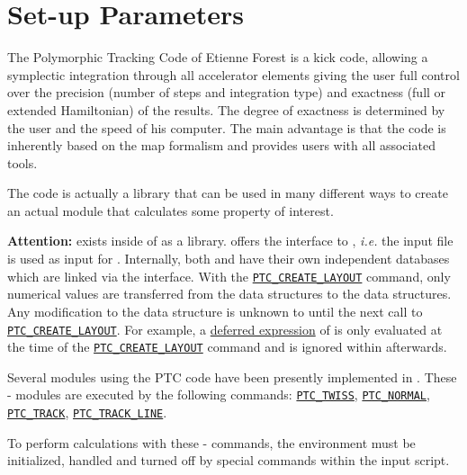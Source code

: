
\chapter{\ptc Set-up Parameters}
\label{chap:ptc-setup}

The Polymorphic Tracking Code \cite{forest2002} of Etienne
Forest is a kick code, allowing a symplectic integration through all
accelerator elements giving the user full control over the precision
(number of   steps and integration type) and exactness (full or extended
Hamiltonian) of the   results. 
The degree of exactness is determined by the user and the speed of his
computer.  
The main advantage is that the code is inherently based on the map
formalism and provides users with all associated tools. 

The \ptc code is actually a library that can be used in many different
ways to create an actual module that calculates some property of
interest. 

\textbf{Attention:}
\ptc exists inside of \madx as a library. \madx offers the interface to
\ptc, \textsl{i.e.} the \madx input file is used as input for \ptc.
Internally, both \ptc and \madx have their own independent databases
which are linked via the interface. With the
\hyperref[sec:ptc-create-layout]{\texttt{PTC\_CREATE\_LAYOUT}} command,
only numerical values are transferred 
from the \madx data structures to the \ptc data structures. Any
modification to the \madx data structure is unknown to \ptc until the
next call to \hyperref[sec:ptc-create-layout]{\texttt{PTC\_CREATE\_LAYOUT}}. 
For example, a \hyperref[sec:defer]{deferred expression} of \madx is
only evaluated at the time of the
\hyperref[sec:ptc-create-layout]{\texttt{PTC\_CREATE\_LAYOUT}} command and
is ignored within \ptc afterwards. 


Several modules using the PTC code have been presently implemented in
\madx. These {\madx}-{\ptc} modules\cite{schmidt2005} are executed by
the following commands: 
\hyperref[chap:ptc-twiss]{\texttt{PTC\_TWISS}},
\hyperref[chap:ptc-normal]{\texttt{PTC\_NORMAL}},
\hyperref[chap:ptc-track]{\texttt{PTC\_TRACK}},
\hyperref[sec:ptc-trackline]{\texttt{PTC\_TRACK\_LINE}}. 

To perform calculations with these {\madx}-{\ptc} commands, the \ptc
environment must be initialized, handled and turned off by special
commands within the \madx input script. 

